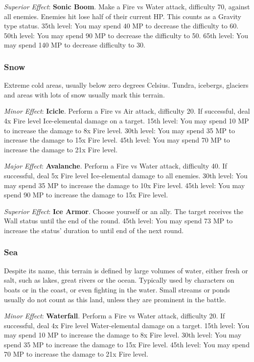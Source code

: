 \begin{multicols}{2}
	\textit{Superior Effect}: \textbf{Sonic Boom}. Make a Fire vs Water attack, difficulty 70, against all enemies. Enemies hit lose half of their current HP. This counts as a Gravity type status. 35th level: You may spend 40 MP to decrease the difficulty to 60. 50th level: You may spend 90 MP to decrease the difficulty to 50. 65th level: You may spend 140 MP to decrease difficulty to 30.

    \subsubsection{Snow}

	Extreme cold areas, usually below zero degrees Celsius. Tundra, icebergs, glaciers and areas with lots of snow usually mark this terrain.

	\textit{Minor Effect}: \textbf{Icicle}. Perform a Fire vs Air attack, difficulty 20. If successful, deal 4x Fire level Ice-elemental damage on a target. 15th level: You may spend 10 MP to increase the damage to 8x Fire level. 30th level: You may spend 35 MP to increase the damage to 15x Fire level. 45th level: You may spend 70 MP to increase the damage to 21x Fire level.

	\textit{Major Effect}: \textbf{Avalanche}. Perform a Fire vs Water attack, difficulty 40. If successful, deal 5x Fire level Ice-elemental damage to all enemies. 30th level: You may spend 35 MP to increase the damage to 10x Fire level. 45th level: You may spend 90 MP to increase the damage to 15x Fire level.

	\textit{Superior Effect}: \textbf{Ice Armor}. Choose yourself or an ally. The target receives the Wall status until the end of the round. 45th level: You may spend 73 MP to increase the status’ duration to until end of the next round.

    \subsubsection{Sea}

    Despite its name, this terrain is defined by large volumes of water, either fresh or salt, such as lakes, great rivers or the ocean. Typically used by characters on boats or in the coast, or even fighting in the water. Small streams or ponds usually do not count as this land, unless they are prominent in the battle.

	\textit{Minor Effect}: \textbf{Waterfall}. Perform a Fire vs Water attack, difficulty 20. If successful, deal 4x Fire level Water-elemental damage on a target. 15th level: You may spend 10 MP to increase the damage to 8x Fire level. 30th level: You may spend 35 MP to increase the damage to 15x Fire level. 45th level: You may spend 70 MP to increase the damage to 21x Fire level.


\end{multicols}
